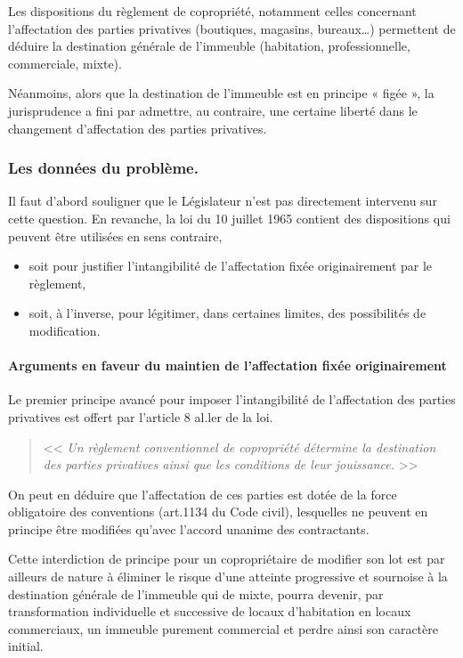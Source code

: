 		Les dispositions du règlement de copropriété, notamment celles concernant l’affectation des parties privatives (boutiques, magasins, bureaux…) permettent de déduire la destination générale de l’immeuble (habitation, professionnelle, commerciale, mixte).
		
		Néanmoins, alors que la destination de l’immeuble est en principe « figée », la jurisprudence a fini par admettre, au contraire, une certaine liberté dans le changement d’affectation des parties privatives.
		
		\subsubsection{Les données du problème.}
		
			Il faut d'abord souligner que le Législateur n'est pas directement intervenu sur cette question. En revanche, la loi du 10 juillet 1965 contient des dispositions qui peuvent être utilisées en sens contraire,
			\begin{itemize}
				\item soit pour justifier l'intangibilité de l'affectation fixée originairement par le règlement,
				\item soit, à l'inverse, pour légitimer, dans certaines limites, des possibilités de modification.
			\end{itemize}
			
			\paragraph{Arguments en faveur du maintien de l'affectation fixée originairement}
			
				Le premier principe avancé pour imposer l'intangibilité de l'affectation des parties privatives est offert par l'article 8 al.ler de la loi.
				\begin{quote}
					<< {\itshape Un règlement conventionnel de copropriété détermine la destination des parties privatives ainsi que les conditions de leur jouissance.} >>
				\end{quote}
				
				On peut en déduire que l'affectation de ces parties est dotée de la force obligatoire des conventions (art.1134 du Code civil), lesquelles ne peuvent en principe être modifiées qu'avec l'accord unanime des contractants.
				
				Cette interdiction de principe pour un copropriétaire de modifier son lot est par ailleurs de nature à éliminer le risque d'une atteinte progressive et sournoise à la destination générale de l'immeuble qui de mixte, pourra devenir, par transformation individuelle et successive de locaux d'habitation en locaux commerciaux, un immeuble purement commercial et perdre ainsi son caractère initial.
				
